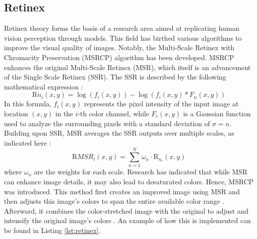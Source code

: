 \documentclass[sigconf]{acmart}
\begin{document}
\subsection{Retinex}\label{sec:retinex}
Retinex theory forms the basis of a research area aimed at replicating human vision perception through models. This field has birthed various algorithms to improve the visual quality of images. Notably, the Multi-Scale Retinex with Chromacity Preservation (MSRCP) algorithm has been developed. MSRCP enhances the original Multi-Scale Retinex (MSR), which itself is an advancement of the Single Scale Retinex (SSR). The SSR is described by the following mathematical expression \cite{petro2014multiscale,barnard1998investigations}:
\begin{equation}
\text{R}{n_i}(x,y) = \log(f_i(x,y)) - \log(f_i(x,y) \ast F_n(x,y))
\end{equation}
In this formula, $f_i(x,y)$ represents the pixel intensity of the input image at location $(x,y)$ in the $i$-th color channel, while $F_c(x,y)$ is a Gaussian function used to analyze the surrounding pixels with a standard deviation of $\sigma = n$. Building upon SSR, MSR averages the SSR outputs over multiple scales, as indicated here \cite{petro2014multiscale,barnard1998investigations}:
\begin{equation}
\text{R}{MSR_i}(x,y) = \sum_{n=1}^{N} \omega_n \cdot \text{R}_{n_i}(x,y)
\end{equation}
where $\omega_n$ are the weights for each scale. Research has indicated that while MSR can enhance image details, it may also lead to desaturated colors. Hence, MSRCP was introduced. This method first creates an improved image using MSR and then adjusts this image's colors to span the entire available color range \cite{petro2014multiscale}. Afterward, it combines the color-stretched image with the original to adjust and intensify the original image's colors \cite{petro2014multiscale}. An example of how this is implemented can be found in Listing \ref{lst:retinex}.
\end{document}
